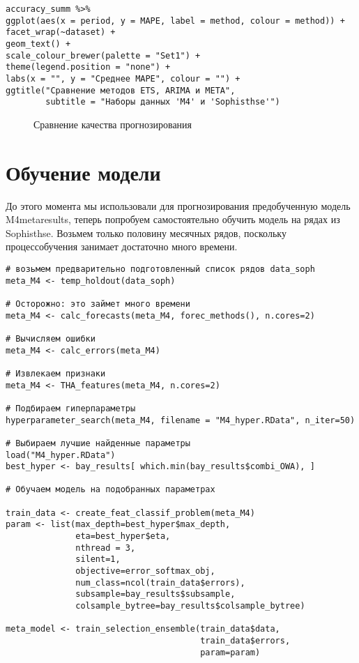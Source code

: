 \documentclass[a4paper,12pt]{article}
\theoremstyle{plain} %
\theoremstyle{definition} %
\theoremstyle{remark} %
\begin{document}
\begin{verbatim}
accuracy_summ %>%
ggplot(aes(x = period, y = MAPE, label = method, colour = method)) +
facet_wrap(~dataset) +
geom_text() +
scale_colour_brewer(palette = "Set1") +
theme(legend.position = "none") +
labs(x = "", y = "Среднее MAPE", colour = "") +
ggtitle("Сравнение методов ETS, ARIMA и META",
        subtitle = "Наборы данных 'M4' и 'Sophisthse'")
\end{verbatim}

\begin{figure}[H]
  \noindent{}
  \caption{Сравнение качества прогнозирования}
\end{figure}


\section{Обучение модели}

До этого момента мы использовали для прогнозирования предобученную модель M4metaresults, теперь попробуем самостоятельно обучить модель на рядах из Sophisthse. Возьмем только половину месячных рядов, поскольку процессобучения занимает достаточно много времени.

\begin{verbatim}
# возьмем предварительно подготовленный список рядов data_soph
meta_M4 <- temp_holdout(data_soph)

# Осторожно: это займет много времени
meta_M4 <- calc_forecasts(meta_M4, forec_methods(), n.cores=2)

# Вычисляем ошибки
meta_M4 <- calc_errors(meta_M4)

# Извлекаем признаки
meta_M4 <- THA_features(meta_M4, n.cores=2)

# Подбираем гиперпараметры
hyperparameter_search(meta_M4, filename = "M4_hyper.RData", n_iter=50)

# Выбираем лучшие найденные параметры
load("M4_hyper.RData")
best_hyper <- bay_results[ which.min(bay_results$combi_OWA), ]

# Обучаем модель на подобранных параметрах

train_data <- create_feat_classif_problem(meta_M4)
param <- list(max_depth=best_hyper$max_depth,
              eta=best_hyper$eta,
              nthread = 3,
              silent=1,
              objective=error_softmax_obj,
              num_class=ncol(train_data$errors),
              subsample=bay_results$subsample,
              colsample_bytree=bay_results$colsample_bytree)

meta_model <- train_selection_ensemble(train_data$data,
                                       train_data$errors,
                                       param=param)

\end{verbatim}
\end{document}
